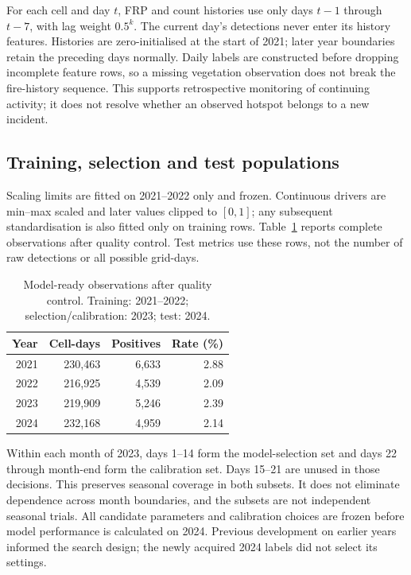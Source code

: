 \documentclass[conference]{IEEEtran}
\begin{document}
For each cell and day $t$, FRP and count histories use only days $t-1$ through $t-7$, with lag weight $0.5^k$. The current day's detections never enter its history features. Histories are zero-initialised at the start of 2021; later year boundaries retain the preceding days normally. Daily labels are constructed before dropping incomplete feature rows, so a missing vegetation observation does not break the fire-history sequence. This supports retrospective monitoring of continuing activity; it does not resolve whether an observed hotspot belongs to a new incident.

\subsection{Training, selection and test populations}
Scaling limits are fitted on 2021--2022 only and frozen. Continuous drivers are min--max scaled and later values clipped to $[0,1]$; any subsequent standardisation is also fitted only on training rows. Table~\ref{tab:data} reports complete observations after quality control. Test metrics use these rows, not the number of raw detections or all possible grid-days.

\begin{table}[!t]\centering\footnotesize
\caption{Model-ready observations after quality control. Training: 2021--2022; selection/calibration: 2023; test: 2024.}\label{tab:data}
\begin{tabular}{rrrr}\toprule
Year & Cell-days & Positives & Rate (\%)\\\midrule
2021 & 230,463 & 6,633 & 2.88 \\
2022 & 216,925 & 4,539 & 2.09 \\
2023 & 219,909 & 5,246 & 2.39 \\
2024 & 232,168 & 4,959 & 2.14 \\
\bottomrule\end{tabular}\end{table}

Within each month of 2023, days 1--14 form the model-selection set and days 22 through month-end form the calibration set. Days 15--21 are unused in those decisions. This preserves seasonal coverage in both subsets. It does not eliminate dependence across month boundaries, and the subsets are not independent seasonal trials. All candidate parameters and calibration choices are frozen before model performance is calculated on 2024. Previous development on earlier years informed the search design; the newly acquired 2024 labels did not select its settings.
\end{document}
